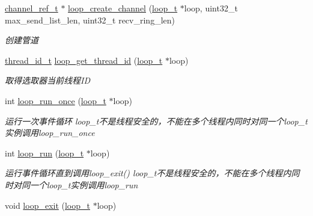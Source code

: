 \begin{DoxyCompactItemize}
\hyperlink{a00044_a151271c9d188ef28d4d24bb81dcc1263_a151271c9d188ef28d4d24bb81dcc1263}{channel\+\_\+ref\+\_\+t} $\ast$ \hyperlink{a00085_gab5b73ea9a0347b431f93ebf30ecd05b5_gab5b73ea9a0347b431f93ebf30ecd05b5}{loop\+\_\+create\+\_\+channel} (\hyperlink{a00044_a9c3ad1cd2de83e09f3a7b59fa82c94ee_a9c3ad1cd2de83e09f3a7b59fa82c94ee}{loop\+\_\+t} $\ast$loop, uint32\+\_\+t max\+\_\+send\+\_\+list\+\_\+len, uint32\+\_\+t recv\+\_\+ring\+\_\+len)
\begin{DoxyCompactList}\small\item\em 创建管道 \end{DoxyCompactList}\item 
\hyperlink{a00044_ad0ada5642d10ce71bdd90816182f9b79_ad0ada5642d10ce71bdd90816182f9b79}{thread\+\_\+id\+\_\+t} \hyperlink{a00052_a1a9b3ef7cb2655dbabeabeeae2f8f299_a1a9b3ef7cb2655dbabeabeeae2f8f299}{loop\+\_\+get\+\_\+thread\+\_\+id} (\hyperlink{a00044_a9c3ad1cd2de83e09f3a7b59fa82c94ee_a9c3ad1cd2de83e09f3a7b59fa82c94ee}{loop\+\_\+t} $\ast$loop)
\begin{DoxyCompactList}\small\item\em 取得选取器当前线程\+I\+D \end{DoxyCompactList}\item 
int \hyperlink{a00085_ga2f1994d76e46cf4855ac955ccd41d9ef_ga2f1994d76e46cf4855ac955ccd41d9ef}{loop\+\_\+run\+\_\+once} (\hyperlink{a00044_a9c3ad1cd2de83e09f3a7b59fa82c94ee_a9c3ad1cd2de83e09f3a7b59fa82c94ee}{loop\+\_\+t} $\ast$loop)
\begin{DoxyCompactList}\small\item\em 运行一次事件循环 loop\+\_\+t不是线程安全的，不能在多个线程内同时对同一个loop\+\_\+t实例调用loop\+\_\+run\+\_\+once \end{DoxyCompactList}\item 
int \hyperlink{a00085_ga8eb0f6c8d398c70fc5ca2292664a1187_ga8eb0f6c8d398c70fc5ca2292664a1187}{loop\+\_\+run} (\hyperlink{a00044_a9c3ad1cd2de83e09f3a7b59fa82c94ee_a9c3ad1cd2de83e09f3a7b59fa82c94ee}{loop\+\_\+t} $\ast$loop)
\begin{DoxyCompactList}\small\item\em 运行事件循环直到调用loop\+\_\+exit() loop\+\_\+t不是线程安全的，不能在多个线程内同时对同一个loop\+\_\+t实例调用loop\+\_\+run \end{DoxyCompactList}\item 
void \hyperlink{a00085_ga898c7e8ef4ff2f360a32454b2b1013de_ga898c7e8ef4ff2f360a32454b2b1013de}{loop\+\_\+exit} (\hyperlink{a00044_a9c3ad1cd2de83e09f3a7b59fa82c94ee_a9c3ad1cd2de83e09f3a7b59fa82c94ee}{loop\+\_\+t} $\ast$loop)

\end{DoxyCompactItemize}
